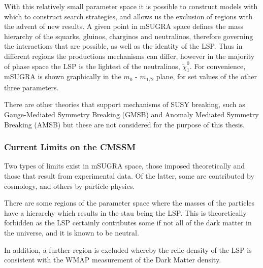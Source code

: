 With this relatively small parameter space it is possible to construct models with which to construct search strategies, and allows us the exclusion of regions with the advent of new results. A given point in mSUGRA space defines the mass hierarchy of the squarks, gluinos, charginos and neutralinos, therefore governing the interactions that are possible, as well as the identity of the LSP. Thus in different regions the productions mechanisms can differ, however in the majority of phase space the LSP is the lightest of the neutralinos, $\tilde{\chi}^{0}_{1}$.  For convenience, mSUGRA is shown graphically in the $m_{0}$ - $m_{1/2}$ plane, for set values of the other three parameters. 

There are other theories that support mechanisms of SUSY breaking, such as Gauge-Mediated Symmetry Breaking (GMSB) and Anomaly Mediated Symmetry Breaking (AMSB) but these are not considered for the purpose of this thesis. 

\subsubsection{Current Limits on the CMSSM}

Two types of limits exist in mSUGRA space, those imposed theoretically and those that result from experimental data. Of the latter, some are contributed by cosmology, and others by particle physics. 

There are some regions of the parameter space where the masses of the particles have a hierarchy which results in the stau being the LSP. This is theoretically forbidden as the LSP certainly contributes some if not all of the dark matter in the universe, and it is known to be neutral. 

In addition, a further region is excluded whereby the relic density of the LSP is consistent with the WMAP measurement of the Dark Matter density. 

